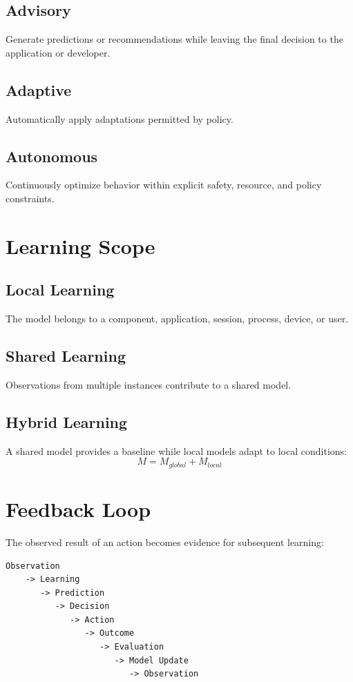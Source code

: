 \documentclass[11pt,a4paper]{article}
\begin{document}
\subsection{Advisory}
Generate predictions or recommendations while leaving the final decision to the application or developer.

\subsection{Adaptive}
Automatically apply adaptations permitted by policy.

\subsection{Autonomous}
Continuously optimize behavior within explicit safety, resource, and policy constraints.

\section{Learning Scope}
\subsection{Local Learning}
The model belongs to a component, application, session, process, device, or user.

\subsection{Shared Learning}
Observations from multiple instances contribute to a shared model.

\subsection{Hybrid Learning}
A shared model provides a baseline while local models adapt to local conditions:
\[
M=M_{global}+M_{local}
\]

\section{Feedback Loop}
The observed result of an action becomes evidence for subsequent learning:
\begin{lstlisting}
Observation
    -> Learning
       -> Prediction
          -> Decision
             -> Action
                -> Outcome
                   -> Evaluation
                      -> Model Update
                         -> Observation
\end{lstlisting}
\end{document}
